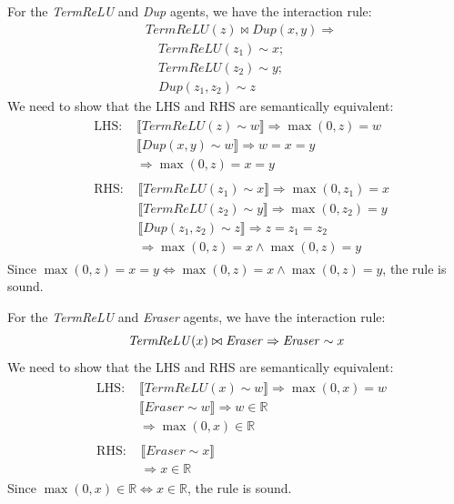 \begin{lemma}
	For the \textit{TermReLU} and \textit{Dup} agents, we have the interaction rule:
	$$
	\begin{aligned}
		& \mathit{TermReLU}(z) \bowtie \mathit{Dup}(x, y) \Rightarrow \\
		& \quad \mathit{TermReLU}(z_1) \sim x; \\
		& \quad \mathit{TermReLU}(z_2) \sim y; \\
		& \quad \mathit{Dup}(z_1, z_2) \sim z
	\end{aligned}
	$$
	We need to show that the LHS and RHS are semantically equivalent:
	$$
	\begin{aligned}
		& \begin{aligned}
			\text{LHS: } & \llbracket \mathit{TermReLU}(z) \sim w \rrbracket \Rightarrow \max(0, z) = w \\
			& \llbracket \mathit{Dup}(x, y) \sim w \rrbracket \Rightarrow w = x = y \\
			& \Rightarrow \max(0, z) = x = y
		\end{aligned} \\
		& \begin{aligned}
			\text{RHS: } & \llbracket \mathit{TermReLU}(z_1) \sim x \rrbracket \Rightarrow \max(0, z_1) = x \\
			& \llbracket \mathit{TermReLU}(z_2) \sim y \rrbracket \Rightarrow \max(0, z_2) = y \\
			& \llbracket \mathit{Dup}(z_1, z_2) \sim z \rrbracket \Rightarrow z = z_1 = z_2 \\
			& \Rightarrow \max(0, z) = x \land \max(0, z) = y
		\end{aligned}
	\end{aligned}
	$$
	Since $\max(0, z) = x = y \iff \max(0, z) = x \land \max(0, z) = y$, the rule is sound.
\end{lemma}

\begin{lemma}
	For the \textit{TermReLU} and \textit{Eraser} agents, we have the interaction rule:
	$$
	\mathit{TermReLU}(x) \bowtie \mathit{Eraser} \Rightarrow \mathit{Eraser} \sim x \\
	$$
	We need to show that the LHS and RHS are semantically equivalent:
	$$
	\begin{aligned}
		& \begin{aligned}
			\text{LHS: } & \llbracket \mathit{TermReLU}(x) \sim w \rrbracket \Rightarrow \max(0, x) = w \\
			& \llbracket \mathit{Eraser} \sim w \rrbracket \Rightarrow w \in \mathbb{R} \\
			& \Rightarrow \max(0, x) \in \mathbb{R}
		\end{aligned} \\
		& \begin{aligned}
			\text{RHS: } & \llbracket \mathit{Eraser} \sim x \rrbracket \\
			& \Rightarrow x \in \mathbb{R}
		\end{aligned}
	\end{aligned}
	$$
	Since $\max(0, x) \in \mathbb{R} \iff x \in \mathbb{R}$, the rule is sound.
\end{lemma}

